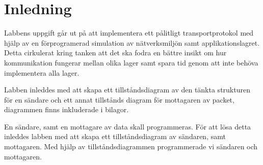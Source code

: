 \section{Inledning}

Labbens uppgift går ut på att implementera ett pålitligt transportprotokol med hjälp av en
förprogramerad simulation av nätverksmiljön samt applikationslagret. Detta cirkulerat kring
tanken att det ska fodra en bättre insikt om hur kommunikation fungerar mellan olika lager samt
spara tid genom att inte behöva implementera alla lager. 

Labben inleddes med att skapa ett tillståndsdiagram av den tänkta strukturen för en sändare och
ett annat tillstånds diagram för mottagaren av packet, diagrammen finns inkluderade i bilagor.

En sändare, samt en mottagare av data skall programmeras. För att lösa detta inleddes
labben med att skapa ett tillståndsdiagram av sändaren, samt mottagaren.
 Med hjälp av tillståndsdiagrammen programmerade vi sändaren och mottagaren.

